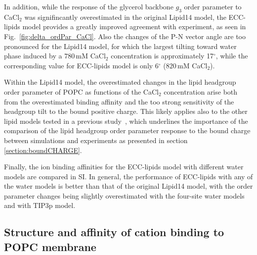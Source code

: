 \documentclass[aip,jcp,twocolumn]{revtex4}
\begin{document}
In addition, while the response of the glycerol backbone $g_3$ order parameter to CaCl$_2$ was
signifincantly overestimated in the original Lipid14 model, the ECC-lipids model
provides a greatly improved agreement with experiment, as seen in Fig.~\ref{fig:delta_ordPar_CaCl}.
Also the changes of the P-N vector angle are too pronounced
for the Lipid14 model, for which the largest tilting toward water phase 
induced by a $780\,\mathrm{mM}$ CaCl$_2$ concentration
is approximately 17$^{\circ}$, while the corresponding
value for ECC-lipids model is only 6$^{\circ}$ ($820\,\mathrm{mM}$ CaCl$_2$).

Within the Lipid14 model, 
the overestimated changes in the lipid headgroup order parameter of POPC  as functions of the CaCl$_2$ concentration arise both from the overestimated
binding affinity and the too strong sensitivity of the headgroup tilt to the bound positive charge.
This likely applies also to the other lipid models tested in a previous study~\cite{catte16},
which underlines the importance of the comparison of the lipid headgroup order parameter response
to the bound charge between simulations and experiments as presented in section \ref{section:boundCHARGE}.

Finally, the ion binding affinities for the ECC-lipids model with different water models are compared in SI. 
In general, the performance of ECC-lipids with any of the water models 
is better than that of the original Lipid14 model, with the order parameter changes being slightly overestimated
with the four-site water models and with TIP3p model.







\subsection{Structure and affinity of cation binding to POPC membrane}
\label{sec:affinity}
\end{document}
